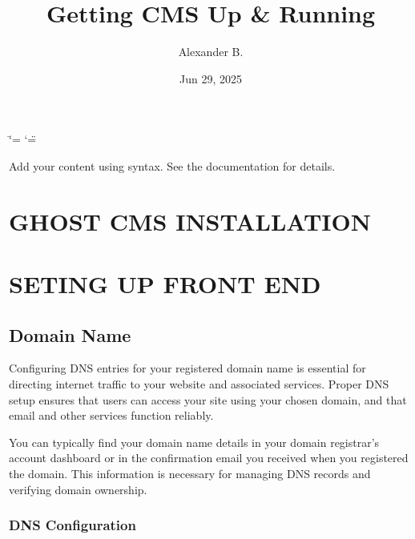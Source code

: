 \documentclass[letterpaper,10pt,english]{sphinxmanual}
\title{Getting CMS Up \& Running}
\date{Jun 29, 2025}
\author{Alexander B.\@{}}
\begin{document}
\ifdefined\shorthandoff
  \ifnum\catcode`\=\string=\active\shorthandoff{=}\fi
  \ifnum\catcode`\"=\active{}\fi
\fi

\pagestyle{empty}
\sphinxmaketitle
\pagestyle{plain}
\sphinxtableofcontents
\pagestyle{normal}
\label{\detokenize{index::doc}}


\sphinxAtStartPar
Add your content using  syntax. See the
documentation for details.

\sphinxstepscope


\chapter{GHOST CMS INSTALLATION}
\label{\detokenize{setup_backend:ghost-cms-installation}}\label{\detokenize{setup_backend::doc}}
\sphinxstepscope


\chapter{SETING UP FRONT END}
\label{\detokenize{setup_frontend:seting-up-front-end}}\label{\detokenize{setup_frontend::doc}}

\section{Domain Name}
\label{\detokenize{setup_frontend:domain-name}}
\noindent{}

\sphinxAtStartPar
Configuring DNS entries for your registered domain name is essential for directing internet traffic to your website and associated services. Proper DNS setup ensures that users can access your site using your chosen domain, and that email and other services function reliably.

\sphinxAtStartPar
You can typically find your domain name details in your domain registrar’s account dashboard or in the confirmation email you received when you registered the domain. This information is necessary for managing DNS records and verifying domain ownership.


\subsection{DNS Configuration}
\label{\detokenize{setup_frontend:dns-configuration}}
\end{document}
